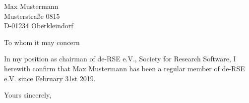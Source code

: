 \documentclass[de-RSE_Brief_en,a4paper]{scrlttr2}
\begin{document}

\begin{letter}{
    Max Mustermann\\
    Musterstraße 0815\\
    D-01234 Oberkleindorf
}
\opening{To whom it may concern}
In my position as chairman of de-RSE e.V., Society for Research Software, I herewith confirm that
%
Max Mustermann
%
has been a regular member of de-RSE e.V. since
%
 February 31st 2019.


\closing{Yours sincerely,}
\end{letter}
\end{document}
